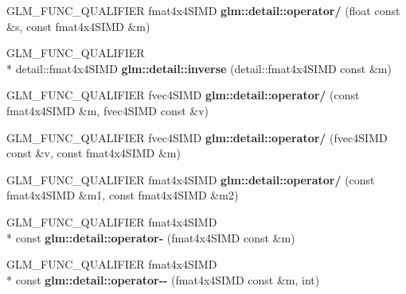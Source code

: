 \begin{DoxyCompactItemize}
\item 
\hypertarget{namespaceglm_1_1detail_a33235564824caa327d104e227bc64045}{G\-L\-M\-\_\-\-F\-U\-N\-C\-\_\-\-Q\-U\-A\-L\-I\-F\-I\-E\-R fmat4x4\-S\-I\-M\-D {\bfseries glm\-::detail\-::operator/} (float const \&s, const fmat4x4\-S\-I\-M\-D \&m)}\label{namespaceglm_1_1detail_a33235564824caa327d104e227bc64045}

\item 
\hypertarget{namespaceglm_1_1detail_a4d5c895b3548f6c8296fd6a9980fe3e1}{G\-L\-M\-\_\-\-F\-U\-N\-C\-\_\-\-Q\-U\-A\-L\-I\-F\-I\-E\-R \\*
detail\-::fmat4x4\-S\-I\-M\-D {\bfseries glm\-::detail\-::inverse} (detail\-::fmat4x4\-S\-I\-M\-D const \&m)}\label{namespaceglm_1_1detail_a4d5c895b3548f6c8296fd6a9980fe3e1}

\item 
\hypertarget{namespaceglm_1_1detail_a9041c53e82c0b0191b24185e14e2b55f}{G\-L\-M\-\_\-\-F\-U\-N\-C\-\_\-\-Q\-U\-A\-L\-I\-F\-I\-E\-R fvec4\-S\-I\-M\-D {\bfseries glm\-::detail\-::operator/} (const fmat4x4\-S\-I\-M\-D \&m, fvec4\-S\-I\-M\-D const \&v)}\label{namespaceglm_1_1detail_a9041c53e82c0b0191b24185e14e2b55f}

\item 
\hypertarget{namespaceglm_1_1detail_a147045f9002e1195039f968a2396c435}{G\-L\-M\-\_\-\-F\-U\-N\-C\-\_\-\-Q\-U\-A\-L\-I\-F\-I\-E\-R fvec4\-S\-I\-M\-D {\bfseries glm\-::detail\-::operator/} (fvec4\-S\-I\-M\-D const \&v, const fmat4x4\-S\-I\-M\-D \&m)}\label{namespaceglm_1_1detail_a147045f9002e1195039f968a2396c435}

\item 
\hypertarget{namespaceglm_1_1detail_ace681b03cfb7d72e2633dc06d4cee962}{G\-L\-M\-\_\-\-F\-U\-N\-C\-\_\-\-Q\-U\-A\-L\-I\-F\-I\-E\-R fmat4x4\-S\-I\-M\-D {\bfseries glm\-::detail\-::operator/} (const fmat4x4\-S\-I\-M\-D \&m1, const fmat4x4\-S\-I\-M\-D \&m2)}\label{namespaceglm_1_1detail_ace681b03cfb7d72e2633dc06d4cee962}

\item 
\hypertarget{namespaceglm_1_1detail_a7f0cc16af5799679034230c9cea81b10}{G\-L\-M\-\_\-\-F\-U\-N\-C\-\_\-\-Q\-U\-A\-L\-I\-F\-I\-E\-R fmat4x4\-S\-I\-M\-D \\*
const {\bfseries glm\-::detail\-::operator-\/} (fmat4x4\-S\-I\-M\-D const \&m)}\label{namespaceglm_1_1detail_a7f0cc16af5799679034230c9cea81b10}

\item 
\hypertarget{namespaceglm_1_1detail_a37b1c3ee6bcd2c5e56d49e2ea90f4ee5}{G\-L\-M\-\_\-\-F\-U\-N\-C\-\_\-\-Q\-U\-A\-L\-I\-F\-I\-E\-R fmat4x4\-S\-I\-M\-D \\*
const {\bfseries glm\-::detail\-::operator-\/-\/} (fmat4x4\-S\-I\-M\-D const \&m, int)}\label{namespaceglm_1_1detail_a37b1c3ee6bcd2c5e56d49e2ea90f4ee5}


\end{DoxyCompactItemize}
